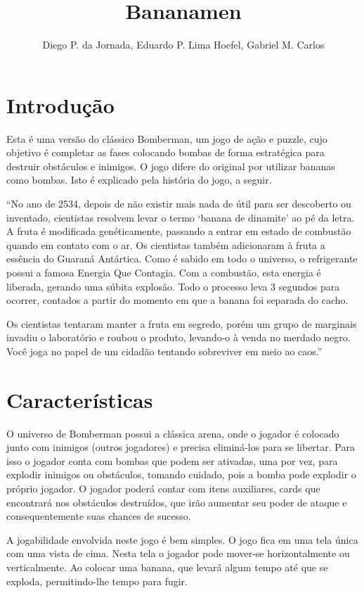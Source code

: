 \documentclass[12pt]{article}
\title{Bananamen}
\author{Diego P. da Jornada, Eduardo P. Lima Hoefel, Gabriel M. Carlos}
\begin{document}
 

\maketitle

\section{Introdução}

	Esta é uma versão do clássico Bomberman, um jogo de ação
	e puzzle, cujo objetivo é completar as fases colocando
	bombas de forma estratégica para destruir obstáculos e
	inimigos. O jogo difere do original por utilizar bananas
	como bombas. Isto é explicado pela história do jogo, a
	seguir.
	
	``No ano de 2534, depois de não existir mais nada de útil
	para ser descoberto ou inventado, cientistas resolvem
	levar o termo `banana de dinamite' ao pé da letra. A
	fruta é modificada genéticamente, passando a entrar em
	estado de combustão quando em contato com o ar. Os
	cientistas também adicionaram à fruta a essência do
	Guaraná Antártica\textregistered.  Como é sabido em todo
	o universo, o refrigerante possui a famosa Energia Que
	Contagia\texttrademark. Com a combustão, esta energia é
	liberada, gerando uma súbita explosão.  Todo o processo
	leva 3 segundos para ocorrer, contados a partir do
	momento em que a banana foi separada do cacho.

	Os cientistas tentaram manter a fruta em segredo, porém
	um grupo de marginais invadiu o laboratório e roubou o
	produto, levando-o à venda no merdado negro. Você joga
	no papel de um cidadão tentando sobreviver em meio ao
	caos.''

\section{Características}

	O universo de Bomberman possui a clássica arena, onde o
	jogador é colocado junto com inimigos (outros jogadores)
	e precisa eliminá-los para se libertar. Para isso o
	jogador conta com bombas que podem ser ativadas, uma por
	vez, para explodir inimigos ou obstáculos, tomando
	cuidado, pois a bomba pode explodir o próprio jogador. O
	jogador poderá contar com itens auxiliares, cards que
	encontrará nos obstáculos destruídos, que irão aumentar
	seu poder de ataque e consequentemente suas chances de
	sucesso.

	A jogabilidade envolvida neste jogo é bem simples. O
	jogo fica em uma tela única com uma vista de cima. Nesta
	tela o jogador pode mover-se horizontalmente ou
	verticalmente. Ao colocar uma banana, que levará algum
	tempo até que se exploda, permitindo-lhe tempo para
	fugir.
\end{document}
